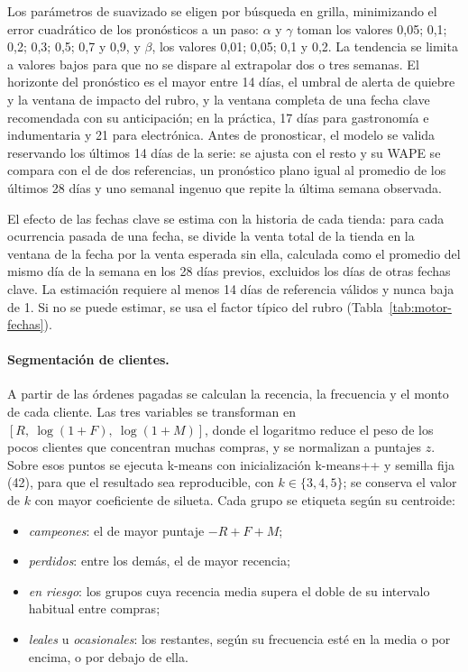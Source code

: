 Los parámetros de suavizado se eligen por búsqueda en grilla, minimizando el error cuadrático de los pronósticos a un paso: $\alpha$ y $\gamma$ toman los valores 0,05; 0,1; 0,2; 0,3; 0,5; 0,7 y 0,9, y $\beta$, los valores 0,01; 0,05; 0,1 y 0,2. La tendencia se limita a valores bajos para que no se dispare al extrapolar dos o tres semanas. El horizonte del pronóstico es el mayor entre 14 días, el umbral de alerta de quiebre y la ventana de impacto del rubro, y la ventana completa de una fecha clave recomendada con su anticipación; en la práctica, 17 días para gastronomía e indumentaria y 21 para electrónica. Antes de pronosticar, el modelo se valida reservando los últimos 14 días de la serie: se ajusta con el resto y su WAPE se compara con el de dos referencias, un pronóstico plano igual al promedio de los últimos 28 días y uno semanal ingenuo que repite la última semana observada.

El efecto de las fechas clave se estima con la historia de cada tienda: para cada ocurrencia pasada de una fecha, se divide la venta total de la tienda en la ventana de la fecha por la venta esperada sin ella, calculada como el promedio del mismo día de la semana en los 28 días previos, excluidos los días de otras fechas clave. La estimación requiere al menos 14 días de referencia válidos y nunca baja de 1. Si no se puede estimar, se usa el factor típico del rubro (Tabla~\ref{tab:motor-fechas}).

\paragraph{Segmentación de clientes.} A partir de las órdenes pagadas se calculan la recencia, la frecuencia y el monto de cada cliente. Las tres variables se transforman en $[R,\ \log(1+F),\ \log(1+M)]$, donde el logaritmo reduce el peso de los pocos clientes que concentran muchas compras, y se normalizan a puntajes $z$. Sobre esos puntos se ejecuta k-means con inicialización k-means++ y semilla fija (42), para que el resultado sea reproducible, con $k \in \{3, 4, 5\}$; se conserva el valor de $k$ con mayor coeficiente de silueta. Cada grupo se etiqueta según su centroide:

\begin{itemize}
    \item \emph{campeones}: el de mayor puntaje $-R + F + M$;
    \item \emph{perdidos}: entre los demás, el de mayor recencia;
    \item \emph{en riesgo}: los grupos cuya recencia media supera el doble de su intervalo habitual entre compras;
    \item \emph{leales} u \emph{ocasionales}: los restantes, según su frecuencia esté en la media o por encima, o por debajo de ella.
\end{itemize}

